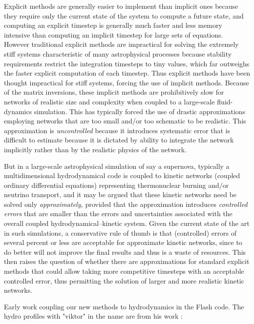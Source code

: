 \documentclass[11pt]{article}
\begin{document}
Explicit methods are generally easier to implement than implicit ones because 
they require only the current state of the system to compute a future state, 
and 
computing an explicit timestep is generally much faster and less memory 
intensive than computing an implicit timestep for large sets of equations. 
However  traditional explicit 
methods are impractical for solving the extremely stiff systems 
characteristic of many astrophysical processes because stability 
requirements restrict the integration timesteps to tiny values, which far 
outweighs the faster explicit computation of each timestep.  Thus explicit 
methods have been thought impractical for stiff systems, 
forcing the use of implicit methods.  Because of the matrix inversions, these 
implicit methods are prohibitively slow for networks of realistic size and 
complexity when coupled to a large-scale fluid-dynamics simulation.  This has 
typically forced the use of drastic approximations employing networks that 
are too small and/or too schematic to be realistic.  This approximation is {\em 
uncontrolled} because it introduces systematic error that is difficult to 
estimate because it is dictated by ability to integrate the network implicitly 
rather than by the realistic physics of the network.

But in a large-scale astrophysical simulation of say a supernova, typically a 
multidimensional hydrodynamical code is coupled to kinetic networks (coupled 
ordinary differential equations) representing thermonuclear burning and/or 
neutrino transport, and it may be argued that these kinetic networks need be 
solved only {\em approximately,} provided that the approximation introduces 
{\em controlled errors} that are  smaller than the errors and 
uncertainties associated with the overall coupled hydrodynamical--kinetic 
system. Given the current state of the art in such simulations, a conservative 
rule of thumb is that (controlled) errors of several percent  or less are 
acceptable for 
approximate kinetic networks, since to do better will not improve the final 
results and thus is a waste of resources. This then raises the question of 
whether there are approximations for standard explicit methods that could allow 
taking more competitive timesteps with an acceptable controlled error, thus 
permitting the solution of larger and more realistic kinetic networks.


Early work coupling our new methods to hydrodynamics in the Flash code.  The 
hydro profiles with "viktor" in the name are from his work \cite{chup2008}:
\end{document}

